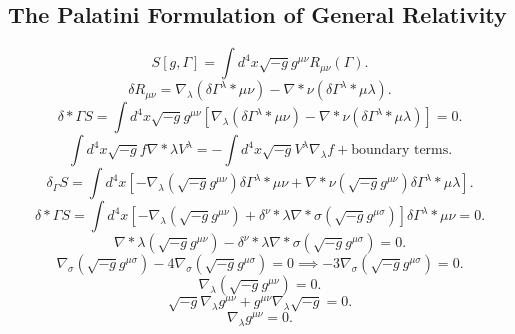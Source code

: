 \documentclass[11pt, a4paper]{report}
\begin{document}
\subsection{The Palatini Formulation of General Relativity}
\begin{equation}
S[g, \Gamma] = \int d^{4}x \sqrt{-g} g^{\mu\nu} R_{\mu\nu}(\Gamma).
\end{equation}
\begin{equation}
\delta R_{\mu\nu} = \nabla_{\lambda}(\delta\Gamma^{\lambda}*{\mu\nu}) - \nabla*{\nu}(\delta\Gamma^{\lambda}*{\mu\lambda}).
\end{equation}
\begin{equation}
\delta*{\Gamma} S = \int d^{4}x \sqrt{-g} g^{\mu\nu} \left[ \nabla_{\lambda}(\delta\Gamma^{\lambda}*{\mu\nu}) - \nabla*{\nu}(\delta\Gamma^{\lambda}*{\mu\lambda}) \right] = 0.
\end{equation}
\begin{equation}
\int d^{4}x \sqrt{-g} f \nabla*{\lambda}V^{\lambda} = - \int d^{4}x \sqrt{-g} V^{\lambda} \nabla_{\lambda}f + \text{boundary terms}.
\end{equation}
\begin{equation}
\delta_{\Gamma} S = \int d^{4}x \left[ -\nabla_{\lambda}(\sqrt{-g}g^{\mu\nu}) \delta\Gamma^{\lambda}*{\mu\nu} + \nabla*{\nu}(\sqrt{-g}g^{\mu\nu}) \delta\Gamma^{\lambda}*{\mu\lambda} \right].
\end{equation}
\begin{equation}
\delta*{\Gamma} S = \int d^{4}x \left[ -\nabla_{\lambda}(\sqrt{-g}g^{\mu\nu}) + \delta^{\nu}*{\lambda} \nabla*{\sigma}(\sqrt{-g}g^{\mu\sigma}) \right] \delta\Gamma^{\lambda}*{\mu\nu} = 0.
\end{equation}
\begin{equation}
\label{eq:palatini_bracket}
\nabla*{\lambda}(\sqrt{-g}g^{\mu\nu}) - \delta^{\nu}*{\lambda} \nabla*{\sigma}(\sqrt{-g}g^{\mu\sigma}) = 0.
\end{equation}
\begin{equation}
\nabla_{\sigma}(\sqrt{-g}g^{\mu\sigma}) - 4 \nabla_{\sigma}(\sqrt{-g}g^{\mu\sigma}) = 0 \implies -3 \nabla_{\sigma}(\sqrt{-g}g^{\mu\sigma}) = 0.
\end{equation}
\begin{equation}
\nabla_{\lambda}(\sqrt{-g}g^{\mu\nu}) = 0.
\end{equation}
\begin{equation}
\sqrt{-g} \nabla_{\lambda}g^{\mu\nu} + g^{\mu\nu} \nabla_{\lambda}\sqrt{-g} = 0.
\end{equation}
\begin{equation}
\nabla_{\lambda}g^{\mu\nu} = 0.
\end{equation}
\end{document}
